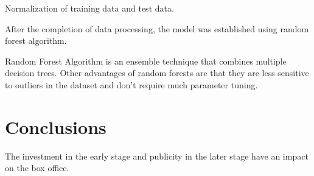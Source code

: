 
Normalization of training data and test data.


After the completion of data processing, the model was established using random forest algorithm.

Random Forest Algorithm is an ensemble technique that combines multiple decision trees. 
    Other advantages of random forests are that they are less sensitive to outliers in the dataset 
    and don’t require much parameter tuning.


\section{Conclusions} \label{sec-conclusions}
The investment in the early stage and publicity in the later stage have an impact on the box office.

